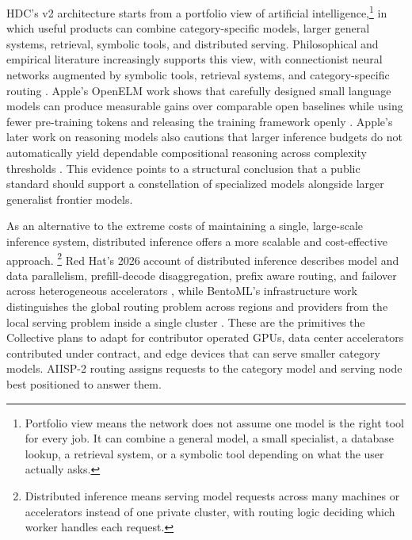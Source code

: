 \documentclass[10pt,a4paper,twocolumn]{article}
\begin{document}
HDC's v2 architecture starts from a portfolio view of artificial intelligence,\footnote{Portfolio view means the network does not assume one model is the right tool for every job. It can combine a general model, a small specialist, a database lookup, a retrieval system, or a symbolic tool depending on what the user actually asks.} in which useful products can combine category-specific models, larger general systems, retrieval, symbolic tools, and distributed serving. Philosophical and empirical literature increasingly supports this view, with connectionist neural networks augmented by symbolic tools, retrieval systems, and category-specific routing \citep{milliere2024philosophy}. Apple's OpenELM work shows that carefully designed small language models can produce measurable gains over comparable open baselines while using fewer pre-training tokens and releasing the training framework openly \citep{openelm2024}. Apple's later work on reasoning models also cautions that larger inference budgets do not automatically yield dependable compositional reasoning across complexity thresholds \citep{shojaee2025illusion}. This evidence points to a structural conclusion that a public standard should support a constellation of specialized models alongside larger generalist frontier models.

As an alternative to the extreme costs of maintaining a single, large-scale inference system, distributed inference offers a more scalable and cost-effective approach. \footnote{Distributed inference means serving model requests across many machines or accelerators instead of one private cluster, with routing logic deciding which worker handles each request.} Red Hat's 2026 account of distributed inference describes model and data parallelism, prefill-decode disaggregation, prefix aware routing, and failover across heterogeneous accelerators \citep{redhat2026distributed}, while BentoML's infrastructure work distinguishes the global routing problem across regions and providers from the local serving problem inside a single cluster \citep{bentoml2025distributed}. These are the primitives the Collective plans to adapt for contributor operated GPUs, data center accelerators contributed under contract, and edge devices that can serve smaller category models. AIISP-2 routing assigns requests to the category model and serving node best positioned to answer them.
\end{document}
